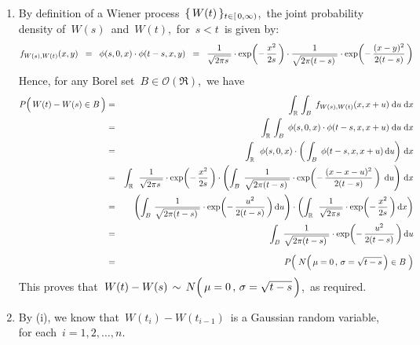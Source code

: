 \begin{enumerate}
\item
	By definition of a Wiener process
	\,$\{\,\overset{{\color{white}.}}{W}(t)\,\}_{t\in[\,0,\infty)}$,\,
	the joint probability density of \,$W(s)$\, and \,$W(t)$,\, for \,$s < t$\,
	is given by:
	\begin{equation*}
	f_{W(s),W(t)}(x,y)
	\;\; = \;\;
		\phi(s,0,x) \cdot \phi(t - s,x,y)
	\;\; = \;\;
		\dfrac{1}{\sqrt{2\pi s{\color{white}.}}} \cdot \exp\!\left(-\,\dfrac{x^{2}}{2 s}\,\right)
		\cdot
		\dfrac{1}{\sqrt{2\pi(t-s){\color{white}.}}} \cdot \exp\!\left(-\,\dfrac{(x-y)^{2}}{2(t-s)}\,\right)
	\end{equation*}
	Hence, for any Borel set \,$B \in \mathcal{O}(\Re)$,\, we have
	\begin{eqnarray*}
	P\!\left(\, W(t) - W(s) \overset{{\color{white}.}}{\in} B \,\right)
	& = &
		\int_{\Re}\,\int_{B}\; f_{W(s),W(t)}(x,x+u) \;\d u\;\d x
	\\
	& = &
		\int_{\Re}\,\int_{B}\;
			\phi(s,0,x) \cdot \phi(t - s,x,x+u)
			\;\d u\;\d x
	\\
	& = &
		\int_{\Re}\;\,
			\phi(s,0,x)
			\cdot
			\left(\,\int_{B}\; \phi(t - s,x,x+u)\,\d u\right)
			\,\d x
	\\
	& = &
		\int_{\Re}\;\,
			\dfrac{1}{\sqrt{2\pi s{\color{white}.}}} \cdot \exp\!\left(-\,\dfrac{x^{2}}{2 s}\,\right)
			\cdot
			\left(\int_{B}\;
				\dfrac{1}{\sqrt{2\pi(t-s){\color{white}.}}} \cdot \exp\!\left(-\,\dfrac{(x-x-u)^{2}}{2(t-s)}\,\right)
				\;\d u\right)
			\,\d x
	\\
	& = &
		\left(\int_{B}\,
			\dfrac{1}{\sqrt{2\pi(t-s){\color{white}.}}} \cdot \exp\!\left(-\,\dfrac{u^{2}}{2(t-s)}\,\right)
			\d u\right)
		\cdot
		\left(\int_{\Re}\;\,
			\dfrac{1}{\sqrt{2\pi s{\color{white}.}}} \cdot \exp\!\left(-\,\dfrac{x^{2}}{2 s}\,\right)
			\d x\right)
	\\
	& = &
		\int_{B}\,
			\dfrac{1}{\sqrt{2\pi(t-s){\color{white}.}}} \cdot \exp\!\left(-\,\dfrac{u^{2}}{2(t-s)}\,\right)
			\d u
	\\
	& \overset{{\color{white}\textnormal{\LARGE$1$}}}{=} &
		P\!\left(\;N\!\left(\,\mu\overset{{\color{white}1}}{=}0\,,\,\sigma = \sqrt{t-s}\,\right) \in B\;\right)
	\end{eqnarray*}
	This proves that
	\,$W(t) - W(s) \,\sim\, N\!\left(\,\mu\overset{{\color{white}1}}{=}0\,,\,\sigma = \sqrt{t-s}\,\right)$,\,
	as required.
\item
	By (i), we know that \,$W(t_{i}) - W(t_{i-1})$\, is a Gaussian random variable, for each \,$i = 1, 2, \ldots, n$.\,

\end{enumerate}
